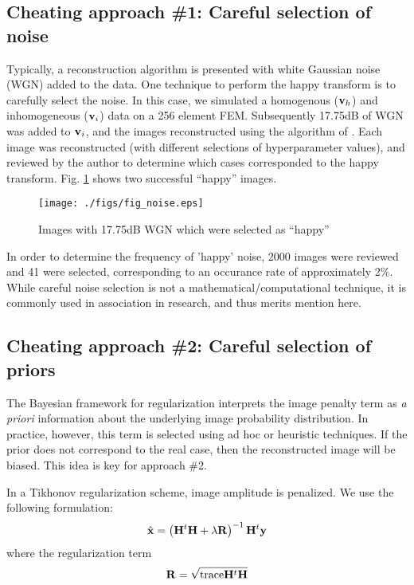 \documentclass[12pt]{iopart}
\begin{document}
\subsection{ Cheating approach \#1:
 Careful selection of noise }

Typically, a reconstruction algorithm is presented
with white Gaussian noise (WGN) added to the data. One
technique to perform the happy transform is to
carefully select the noise.
In this case, we simulated a homogenous (${\bf v}_h$)
and inhomogeneous (${\bf v}_i$) data on a 256
element FEM. Subsequently 17.75dB of WGN was added to
${\bf v}_i$, and the images reconstructed using
the algorithm of \cite{Adler_and_Guardo_1996}.
Each image was reconstructed (with different selections of
hyperparameter values), and reviewed by the author to determine which cases
corresponded to the happy transform.
Fig. \ref{fig:happynoise} shows two successful
``happy'' images.

%
%
\begin{figure}[th]
\begin{flushright}
\texttt{[image: ./figs/fig\_noise.eps]}
\caption{\small 
Images with 17.75dB WGN which were selected as ``happy''
 }
 \label{fig:happynoise}
\end{flushright}
\end{figure}

In order to determine the frequency of 'happy' noise, 2000
images were reviewed and 41 were selected, corresponding
to an occurance rate of approximately 2\%.
While careful noise selection is not a mathematical/computational
technique, it is commonly used in association in research,
and thus merits mention here.

\subsection{ Cheating approach \#2:
             Careful selection of priors}

The Bayesian framework for regularization interprets
the image penalty term as {\em a priori} information 
about the underlying image probability distribution.
In practice, however, this term is selected using
ad hoc or heuristic techniques. If the prior does
not correspond to the real case, then the reconstructed
image will be biased. This idea is key for approach \#2.

In a Tikhonov regularization scheme, image amplitude
is penalized. We use the following formulation:
\begin{equation}
   \hat{\bf x} = 
   \left({\bf H}^t{\bf H} + \lambda{\bf R}\right)^{-1}
         {\bf H}^t{\bf y}
\end{equation}
where the regularization term 
\begin{equation}
   {\bf R} = \sqrt{ \mathrm{trace} {\bf H}^t{\bf H} }
\end{equation}
\end{document}
